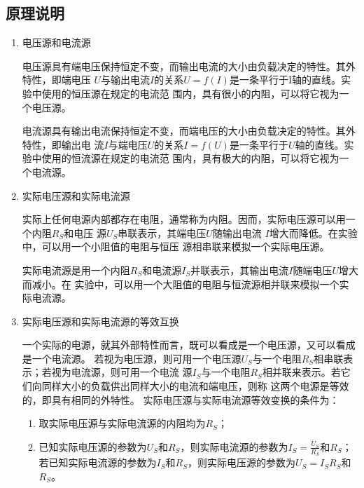 \documentclass[UTF8]{article}
\begin{document}
        \subsection{原理说明}
            \begin{enumerate}[label=\textbf{\arabic*}.]
                \item 电压源和电流源\par
                \noindent\hspace{2em}电压源具有端电压保持恒定不变，而输出电流的大小由负载决定的特性。其外特性，即端电压
                $U$与输出电流$I$的关系$U = f(I)$是一条平行于I轴的直线。实验中使用的恒压源在规定的电流范
                围内，具有很小的内阻，可以将它视为一个电压源。
                \par
                \noindent\hspace{2em}电流源具有输出电流保持恒定不变，而端电压的大小由负载决定的特性。其外特性，即输出电
                流$I$与端电压$U$的关系$I = f(U)$是一条平行于$U$轴的直线。实验中使用的恒流源在规定的电流范
                围内，具有极大的内阻，可以将它视为一个电流源。
                \item 实际电压源和实际电流源\par
                \noindent\hspace{2em}实际上任何电源内部都存在电阻，通常称为内阻。因而，实际电压源可以用一个内阻$R_S$和电压
                源$U_S$串联表示，其端电压$U$随输出电流
                $I$增大而降低。在实验中，可以用一个小阻值的电阻与恒压
                源相串联来模拟一个实际电压源。 
                \par
                \noindent\hspace{2em}实际电流源是用一个内阻$R_S$和电流源$I_S$并联表示，其输出电流$I$随端电压$U$增大而减小。在
                实验中，可以用一个大阻值的电阻与恒流源相并联来模拟一个实际电流源。 
                \item 实际电压源和实际电流源的等效互换\par
                \noindent\hspace{2em}一个实际的电源，就其外部特性而言，既可以看成是一个电压源，又可以看成是一个电流源。
                若视为电压源，则可用一个电压源$U_S$与一个电阻$R_S$相串联表示；若视为电流源，则可用一个电流
                源$I_S$与一个电阻$R_S$相并联来表示。若它们向同样大小的负载供出同样大小的电流和端电压，则称
                这两个电源是等效的，即具有相同的外特性。\newline
                实际电压源与实际电流源等效变换的条件为：
                \begin{enumerate}[label=(\textbf{\arabic*})]
                    \item 取实际电压源与实际电流源的内阻均为$R_S$；
                    \item 已知实际电压源的参数为$U_S$和$R_S$，则实际电流源的参数为$I_S = \frac{U_S}{R_S}$和$R_S$；
                    若已知实际电流源的参数为$I_S$和$R_S$，则实际电压源的参数为$U_S = I_S R_S$和$R_S$。

                \end{enumerate}
            \end{enumerate}
\end{document}
